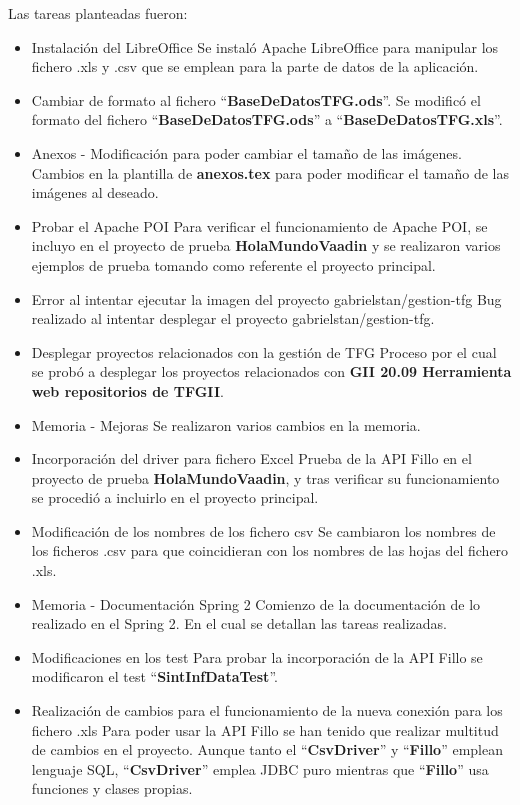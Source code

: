 Las tareas planteadas fueron:
\begin{itemize}
	\tightlist
	\item Instalación del LibreOffice 
		Se instaló Apache LibreOffice para manipular los fichero .xls y .csv que se emplean para la parte de datos de la aplicación.
	\item Cambiar de formato al fichero ``\textbf{BaseDeDatosTFG.ods}''.
		Se modificó el formato del fichero ``\textbf{BaseDeDatosTFG.ods}'' a ``\textbf{BaseDeDatosTFG.xls}''.
	\item Anexos - Modificación para poder cambiar el tamaño de las imágenes.
		Cambios en la plantilla de \textbf{anexos.tex} para poder modificar el tamaño de las imágenes al deseado.
	\item Probar el Apache POI
		Para verificar el funcionamiento de Apache POI, se incluyo en el proyecto de prueba \textbf{HolaMundoVaadin} y se realizaron varios ejemplos de prueba tomando como referente el proyecto principal.
	\item Error al intentar ejecutar la imagen del proyecto gabrielstan/gestion-tfg
		Bug realizado al intentar desplegar el proyecto  gabrielstan/gestion-tfg.  
	\item Desplegar proyectos relacionados con la gestión de TFG
		Proceso por el cual se probó a desplegar los proyectos relacionados con \textbf{GII 20.09 Herramienta web repositorios de TFGII}. 
	\item Memoria - Mejoras
		Se realizaron varios cambios en la memoria.
	\item Incorporación del driver para fichero Excel
		Prueba de la API Fillo en el proyecto de prueba \textbf{HolaMundoVaadin}, y tras verificar su funcionamiento se procedió a incluirlo en el proyecto principal.
	\item Modificación de los nombres de los fichero csv 
		Se cambiaron los nombres de los ficheros .csv para que coincidieran con los nombres de las hojas del fichero .xls. 
	\item Memoria - Documentación Spring 2
		Comienzo de la documentación de lo realizado en el Spring 2. En el cual se detallan las tareas realizadas.
	\item Modificaciones en los test
		Para probar la incorporación de la API Fillo se modificaron el test  ``\textbf{\textbf{SintInfDataTest}}''.
	\item Realización de cambios para el funcionamiento de la nueva conexión para los fichero .xls 
		Para poder usar la API Fillo se han tenido que realizar multitud de cambios en el proyecto. Aunque tanto el ``\textbf{\textbf{CsvDriver}}'' y ``\textbf{\textbf{Fillo}}'' emplean lenguaje SQL, ``\textbf{CsvDriver}'' emplea JDBC puro mientras que ``\textbf{Fillo}'' usa funciones y clases propias.
\end{itemize}

